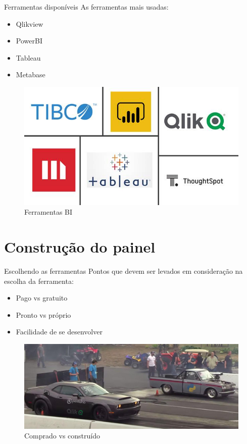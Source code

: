 \documentclass[10pt,t]{beamer}
\begin{document}
\begin{frame}{Ferramentas disponíveis}\label{colorpalette}
	\vspace{8pt}
	As ferramentas mais usadas:
	\begin{itemize}
		\item Qlikview
		\item PowerBI
		\item Tableau
		\item Metabase
	\end{itemize}
\begin{figure}
	\centering
	\includegraphics[scale=0.40]{./imagens/bi_tools.jpg}
	\caption{Ferramentas BI}
\end{figure}
\end{frame} 

\section{Construção do painel}

\begin{frame}{Escolhendo as ferramentas}\label{colorpalette}
	\vspace{8pt}
	Pontos que devem ser levados em consideração na escolha da ferramenta:
	\begin{itemize}
		\item Pago vs gratuito
		\item Pronto vs próprio
		\item Facilidade de se desenvolver
	\end{itemize}
\begin{figure}
	\centering
	\includegraphics[scale=0.25]{./imagens/pronto_vs_construido_escolhido.jpg}
	\caption{Comprado vs construído}
\end{figure}
\end{frame} 
\end{document}
